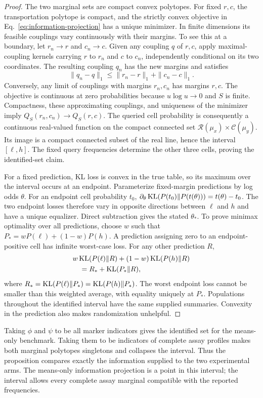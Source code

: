 \begin{proof}
The two marginal sets are compact convex polytopes. For fixed $r,c$, the
transportation polytope is compact, and the strictly convex objective in
Eq.~\eqref{eq:information-projection} has a unique minimizer. In finite
dimensions its feasible couplings vary continuously with their margins. To
see this at a boundary, let $r_n\to r$ and $c_n\to c$. Given any coupling $q$
of $r,c$, apply maximal-coupling kernels carrying $r$ to $r_n$ and $c$ to
$c_n$, independently conditional on its two coordinates. The resulting
coupling $q_n$ has the new margins and satisfies
\[
 \|q_n-q\|_1\leq\|r_n-r\|_1+\|c_n-c\|_1.
\]
Conversely, any limit of couplings with margins $r_n,c_n$ has margins $r,c$.
The objective is continuous at zero probabilities because $u\log u\to0$ and
$S$ is finite. Compactness, these approximating couplings, and uniqueness of
the minimizer imply $Q_S(r_n,c_n)\to Q_S(r,c)$. The queried cell probability
is consequently a continuous real-valued function on the compact connected
set $\mathcal R(\mu_x)\times\mathcal C(\mu_y)$. Its image is a compact connected
subset of the real line, hence the interval $[\ell,h]$. The fixed query
frequencies determine the other three cells, proving the identified-set claim.

For a fixed prediction, KL loss is convex in the true table, so its maximum
over the interval occurs at an endpoint. Parameterize fixed-margin predictions
by log odds $\theta$. For an endpoint cell probability $t_0$,
$\partial_\theta\operatorname{KL}(P(t_0)\Vert P(t(\theta)))=t(\theta)-t_0$.
The two endpoint losses therefore vary in opposite directions between
$\ell$ and $h$ and have a unique equalizer. Direct subtraction gives the stated
$\theta_*$. To prove minimax optimality over all predictions, choose $w$ such
that $P_*=wP(\ell)+(1-w)P(h)$. A prediction assigning zero to an
endpoint-positive cell has infinite worst-case loss. For any other prediction $R$,
\begin{align*}
 &w\operatorname{KL}(P(\ell)\Vert R)+(1-w)\operatorname{KL}(P(h)\Vert R)\\
 &\quad=R_*+\operatorname{KL}(P_*\Vert R),
\end{align*}
where
$R_*=\operatorname{KL}(P(\ell)\Vert P_*)=\operatorname{KL}(P(h)\Vert P_*)$. The worst endpoint loss
cannot be smaller than this weighted average, with equality uniquely at
$P_*$. Populations throughout the identified interval have the same supplied
summaries. Convexity in the prediction also makes randomization unhelpful.
\end{proof}

Taking $\phi$ and $\psi$ to be all marker indicators gives the identified set
for the means-only benchmark. Taking them to be indicators of complete assay
profiles makes both marginal polytopes singletons and collapses the interval.
Thus the proposition compares exactly the information supplied to the two
experimental arms.
The means-only information projection is a point in this interval; the interval
allows every complete assay marginal compatible with the reported frequencies.

